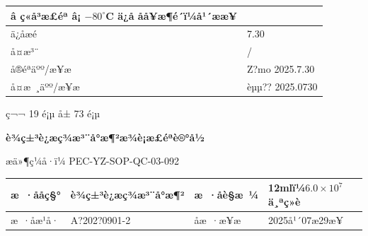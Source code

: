\documentclass[UTF8,10pt,a4paper,fontset=fandol]{ctexart}
\newcommand{\fieldvalue}[1]{#1}
\newcommand{\handwritten}[1]{#1}
\begin{document}
\begin{center}
\begin{tabularx}{\textwidth}{|p{}|X|}
\fieldvalue{â ç«å³æ£éª \quad â¡ $-80^\circ$C ä¿å­}\qquad
å­å¥æ¶é´ï¼\underline{\hspace{1.2cm}}å¹´\underline{\hspace{1.2cm}}æ\underline{\hspace{1.2cm}}æ¥\\
\hline
ä¿å­æé &
\fieldvalue{\handwritten{7.30}}\\
\hline
å¤æ³¨ &
\fieldvalue{\handwritten{/}}\\
\hline
å®éªäºº/æ¥æ &
\fieldvalue{\handwritten{Z?mo}}\quad
\fieldvalue{\handwritten{2025.7.30}}\\
\hline
å¤æ ¸äºº/æ¥æ &
\fieldvalue{\handwritten{èµµ??}}\quad
\fieldvalue{\handwritten{2025.0730}}\\
\hline
\end{tabularx}

\vfill
\centering
ç¬¬ 19 é¡µ å± 73 é¡µ

\newpage

\begin{center}
\textbf{è¾ç±³è¿æç¾æ³¨å°æ¶²æ¾è¡æ£éªè®°å½}
\end{center}

\noindent æä»¶ç¼å·ï¼
\fieldvalue{PEC-YZ-SOP-QC-03-092}

\begin{tabularx}{\textwidth}{|l|X|l|X|}
\hline
æ ·ååç§° &
\fieldvalue{è¾ç±³è¿æç¾æ³¨å°æ¶²} &
æ ·åè§æ ¼ &
\fieldvalue{12mlï¼$6.0\times10^{7}$ä¸ªç»è}
\\ \hline
æ ·åæ¹å· &
\fieldvalue{\handwritten{A?202?0901-2}} &
åæ ·æ¥æ &
\fieldvalue{\handwritten{2025å¹´07æ29æ¥}}
\\ \hline
\end{tabularx}


\end{center}
\end{document}
